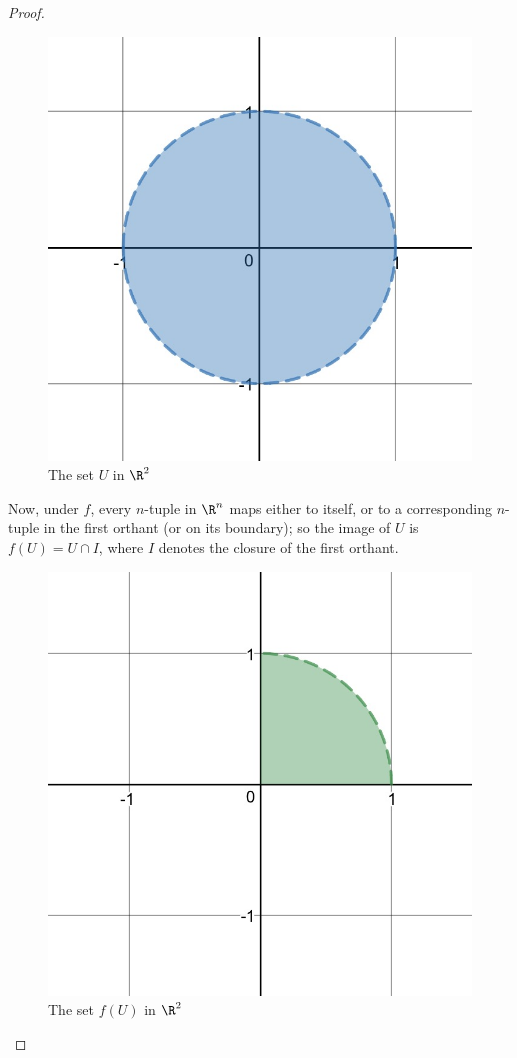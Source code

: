 \documentclass[letterpaper]{article}
\begin{document}
\begin{enumerate}
\begin{example*}
\begin{proof}
\begin{figure}[h]
\centering
\includegraphics[scale=.125]{FullSizeRender}
\caption{The set $U$ in $\R^2$}
\end{figure}

Now, under $f$, every $n$-tuple in $\R^n$ maps either to itself, or to a corresponding $n$-tuple in the first orthant (or on its boundary); so the image of $U$ is $f(U)=U\cap I$, where $I$ denotes the closure of the first orthant.

\begin{figure}[h]
\centering
\includegraphics[scale=.125]{FullSizeRender1}
\caption{The set $f(U)$ in $\R^2$}
\end{figure}


\end{proof}
\end{example*}
\end{enumerate}
\end{document}
